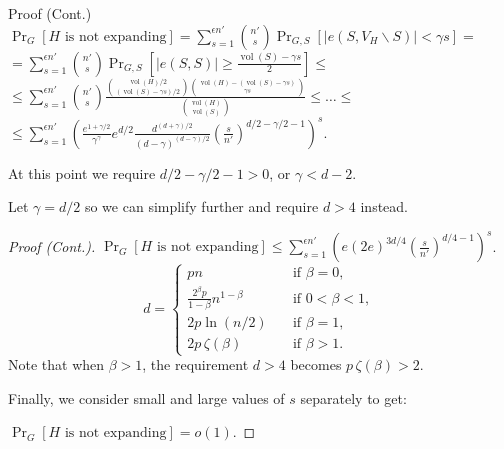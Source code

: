 \documentclass{beamer}
\DeclareMathOperator*{\vol}{vol}
\newcommand{\autotitle}{\secname\ifdefempty{\subsecname}{}{~--- \subsecname}}
\begin{document}
\begin{frame}{\autotitle}
    \small
    \begin{block}{Proof (Cont.)}
        $\Pr_G[H\text{ is not expanding}]
        =\sum_{s=1}^{\epsilon n'}{
            \binom{n'}{s}
            \Pr_{G,S}[|e(S,V_H\backslash S)| < \gamma s]
        }=$
        $=\sum_{s=1}^{\epsilon n'}{
            \binom{n'}{s}
            \Pr_{G,S}\left[|e(S,S)|\geq\frac{\vol(S)-\gamma s}{2}\right]
        }\leq$
        $\leq\sum_{s=1}^{\epsilon n'}{
            \binom{n'}{s}
            \frac{\binom{\vol(H)/2}{(\vol(S)-\gamma s)/2}\binom{\vol(H)-(\vol(S)-\gamma s)}{\gamma s}}{\binom{\vol(H)}{\vol(S)}}
        }\leq\ldots\leq$
        $\leq\sum_{s=1}^{\epsilon n'}{\left(
            \frac{e^{1+\gamma/2}}{\gamma^\gamma}
            e^{d/2}
            \frac{d^{(d+\gamma)/2}}{(d-\gamma)^{(d-\gamma)/2}}
            \left(\frac{s}{n'}\right)^{d/2-\gamma/2-1}
        \right)^s}$.

        At this point we require $d/2-\gamma/2-1>0$, or $\gamma<d-2$.
        
        Let $\gamma=d/2$ so we can simplify further and require $d>4$ instead.
    \end{block}
\end{frame}

\begin{frame}{\autotitle}
    \small
    \begin{proof}[Proof (Cont.)]
        $\Pr_G[H\text{ is not expanding}]
        \leq\sum_{s=1}^{\epsilon n'}{\left(
            e
            (2e)^{3d/4}
            \left(\frac{s}{n'}\right)^{d/4-1}
        \right)^s}$.
    \begin{equation*}
        d=
        \begin{cases}
            pn & \quad \text{if } \beta=0,\\
            \frac{2^\beta p}{1-\beta}n^{1-\beta} & \quad \text{if } 0<\beta<1,\\
            2p\ln(n/2) & \quad \text{if } \beta=1,\\
            2p\,\zeta(\beta) & \quad \text{if } \beta>1.
        \end{cases}
    \end{equation*}
    Note that when $\beta>1$, the requirement $d>4$ becomes $p\,\zeta(\beta)>2$.
    
    Finally, we consider small and large values of $s$ separately to get:
    
    $\Pr_G[H\text{ is not expanding}]=o(1)$.
    \end{proof}
\end{frame}
\end{document}
